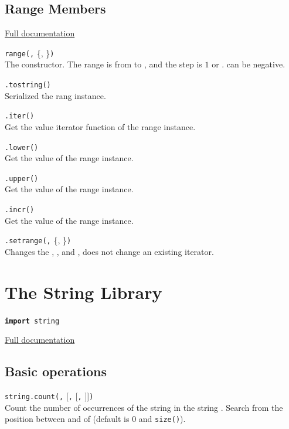 \subsection*{Range Members}

\hangpar \href{https://berry.readthedocs.io/en/latest/source/en/Chapter-7.html\#range-class}{Full documentation}

\hangpar \texttt{range(}\texttt{,} \{, \}\texttt{)}\\
The constructor. The range is from  to , and the step is $1$ or .  can be negative.

\hangpar {}\texttt{.tostring()}\\
Serialized the rang instance.

\hangpar {}\texttt{.iter()}\\
Get the value iterator function of the range instance. 

\hangpar {}\texttt{.lower()}\\
Get the  value of the range instance.

\hangpar {}\texttt{.upper()}\\
Get the  value of the range instance.

\hangpar {}\texttt{.incr()}\\
Get the  value of the range instance.

\hangpar {}\texttt{.setrange(}\texttt{,} \{, \}\texttt{)}\\
Changes the , , and , does not change an existing iterator.

\section*{The String Library}

\hangpar \texttt{\textbf{import} string}

\hangpar \href{https://berry.readthedocs.io/en/latest/source/en/Chapter-7.html\#string-module}{Full documentation}

\subsection*{Basic operations}

\hangpar \texttt{string.count(}\texttt{,} [\texttt{,} [\texttt{,} ]]\texttt{)}\\
Count the number of occurrences of the  string in the string . Search from the position between  and  of  (default is $0$ and \texttt{size(}\texttt{)}).

